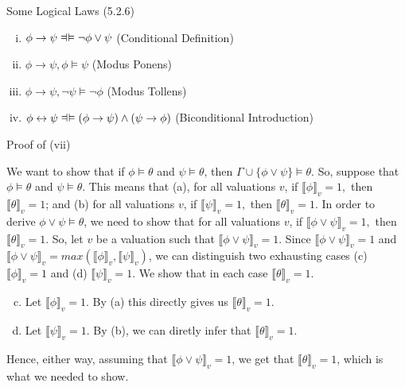 \documentclass[../slides.tex]{subfiles}
\begin{document}
\begin{frame}{Some Logical Laws (5.2.6)}
{\begin{enumerate}[(i)]
				\item $\phi\to\psi\equi \neg\phi\lor\psi$ \hfill (Conditional Definition)
			
				\setcounter{enumi}{21}
				
				\item $\phi\to\psi,\phi\vDash\psi$ \hfill (Modus Ponens)
				
				\item $\phi\to\psi,\neg\psi\vDash\neg\phi$ \hfill (Modus Tollens)
				
				\item $\phi\leftrightarrow\psi\equi (\phi\to\psi)\land(\psi\to\phi)$ \hfill (Biconditional Introduction)
				
			
			\end{enumerate}
}

\end{frame}

\begin{frame}{Proof of (vii)}

We want to show that if $\phi\vDash\theta$ and $\psi\vDash\theta$, then $\Gamma\cup\{\phi\lor\psi\}\vDash\theta$. So, suppose that $\phi\vDash\theta$ and $\psi\vDash\theta$. This means that (a), for all valuations $v$, if $\llbracket \phi\rrbracket_v=1,$ then $\llbracket\theta\rrbracket_v=1$; and (b) for all valuations $v$, if $\llbracket \psi\rrbracket_v=1,$ then $\llbracket\theta\rrbracket_v=1$.	In order to derive $\phi\lor\psi\vDash\theta$, we need to show that for all valuations $v$, if $\llbracket \phi\lor\psi\rrbracket_v=1,$ then $\llbracket\theta\rrbracket_v=1$. So, let $v$ be a valuation such that $\llbracket \phi\lor\psi\rrbracket_v=1$. Since $\llbracket \phi\lor\psi\rrbracket_v=1$ and $\llbracket \phi\lor\psi\rrbracket_v=max(\llbracket \phi\rrbracket_v,\llbracket \psi\rrbracket_v)$, we can distinguish two exhausting cases (c) $\llbracket \phi\rrbracket_v=1$ and (d) $\llbracket \psi\rrbracket_v=1$. We show that in each case $\llbracket\theta\rrbracket_v=1$.
		\begin{enumerate}[(a)]
		\setcounter{enumii}{2}
			\item Let $\llbracket \phi\rrbracket_v=1$. By (a) this directly  gives us $\llbracket\theta\rrbracket_v=1$.
			
			\item Let $\llbracket \psi\rrbracket_v=1$. By (b), we can diretly infer that $\llbracket\theta\rrbracket_v=1$.
		
		\end{enumerate}
		Hence, either way, assuming that $\llbracket \phi\lor\psi\rrbracket_v=1$, we get that $\llbracket\theta\rrbracket_v=1$, which is what we needed to show.


\end{frame}
\end{document}
